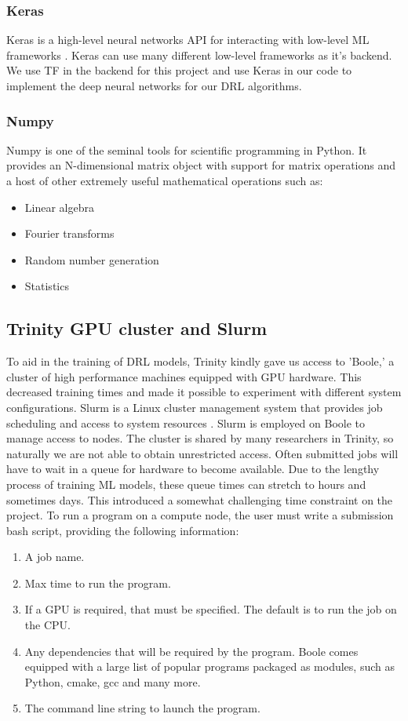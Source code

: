 \subsubsection{Keras}
Keras is a high-level neural networks API for interacting with low-level ML frameworks \cite{keras}. Keras can use many different low-level frameworks as it's backend. We use TF in the backend for this project and use Keras in our code to implement the deep neural networks for our DRL algorithms.

\subsubsection{Numpy}
Numpy is one of the seminal tools for scientific programming in Python. It provides an N-dimensional matrix object with support for matrix operations and a host of other extremely useful mathematical operations such as:
\begin{itemize}
    \item Linear algebra
    \item Fourier transforms
    \item Random number generation
    \item Statistics
\end{itemize}


\subsection{Trinity GPU cluster and Slurm} \label{subsec:boole}
To aid in the training of DRL models, Trinity kindly gave us access to 'Boole,' a cluster of high performance machines equipped with GPU hardware. This decreased training times and made it possible to experiment with different system configurations. Slurm is a Linux cluster management system that provides job scheduling and access to system resources \cite{slurm}. Slurm is employed on Boole to manage access to nodes. The cluster is shared by many researchers in Trinity, so naturally we are not able to obtain unrestricted access. Often submitted jobs will have to wait in a queue for hardware to become available. Due to the lengthy process of training ML models, these queue times can stretch to hours and sometimes days. This introduced a somewhat challenging time constraint on the project. To run a program on a compute node, the user must write a submission bash script, providing the following information:

\begin{enumerate}
    \item A job name.
    \item Max time to run the program.
    \item If a GPU is required, that must be specified. The default is to run the job on the CPU.
    \item Any dependencies that will be required by the program. Boole comes equipped with a large list of popular programs packaged as modules, such as Python, cmake, gcc and many more.
    \item The command line string to launch the program.
\end{enumerate}

